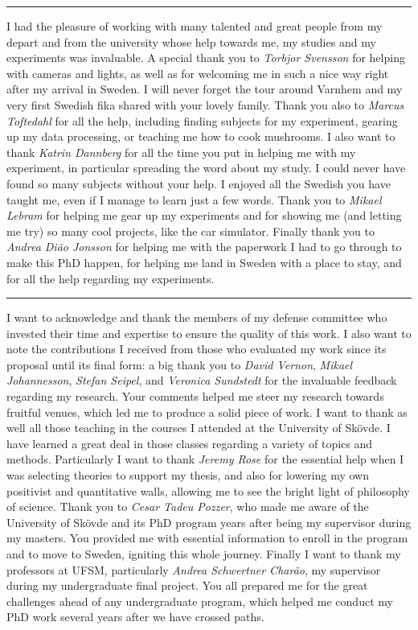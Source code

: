 \vspace{7pt}\hrule\vspace{5pt}

I had the pleasure of working with many talented and great people from my depart and from the university whose help towards me, my studies and my experiments was invaluable. A special thank you to \textit{Torbjor Svensson} for helping with cameras and lights, as well as for welcoming me in such a nice way right after my arrival in Sweden. I will never forget the tour around Varnhem and my very first Swedish fika shared with your lovely family. Thank you also to \textit{Marcus Toftedahl} for all the help, including finding subjects for my experiment, gearing up my data processing, or teaching me how to cook mushrooms. I also want to thank \textit{Katrin Dannberg} for all the time you put in helping me with my experiment, in particular spreading the word about my study. I could never have found so many subjects without your help. I enjoyed all the Swedish you have taught me, even if I manage to learn just a few words. Thank you to \textit{Mikael Lebram} for helping me gear up my experiments and for showing me (and letting me try) so many cool projects, like the car simulator. Finally thank you to \textit{Andrea Di{\~a}o Jonsson} for helping me with the paperwork I had to go through to make this PhD happen, for helping me land in Sweden with a place to stay, and for all the help regarding my experiments.

\vspace{7pt}\hrule\vspace{5pt}

I want to acknowledge and thank the members of my defense committee who invested their time and expertise to ensure the quality of this work. I also want to note the contributions I received from those who evaluated my work since its proposal until its final form: a big thank you to \textit{David Vernon}, \textit{Mikael Johannesson}, \textit{Stefan Seipel}, and \textit{Veronica Sundstedt} for the invaluable feedback regarding my research. Your comments helped me steer my research towards fruitful venues, which led me to produce a solid piece of work. I want to thank as well all those teaching in the courses I attended at the University of Sk{\"o}vde. I have learned a great deal in those classes regarding a variety of topics and methods. Particularly I want to thank \textit{Jeremy Rose} for the essential help when I was selecting theories to support my thesis, and also for lowering my own positivist and quantitative walls, allowing me to see the bright light of philosophy of science. Thank you to \textit{Cesar Tadeu Pozzer}, who made me aware of the University of Sk{\"o}vde and its PhD program years after being my supervisor during my masters. You provided me with essential information to enroll in the program and to move to Sweden, igniting this whole journey. Finally I want to thank my professors at UFSM, particularly \textit{Andrea Schwertner Char{\~a}o}, my supervisor during my undergraduate final project. You all prepared me for the great challenges ahead of any undergraduate program, which helped me conduct my PhD work several years after we have crossed paths.


